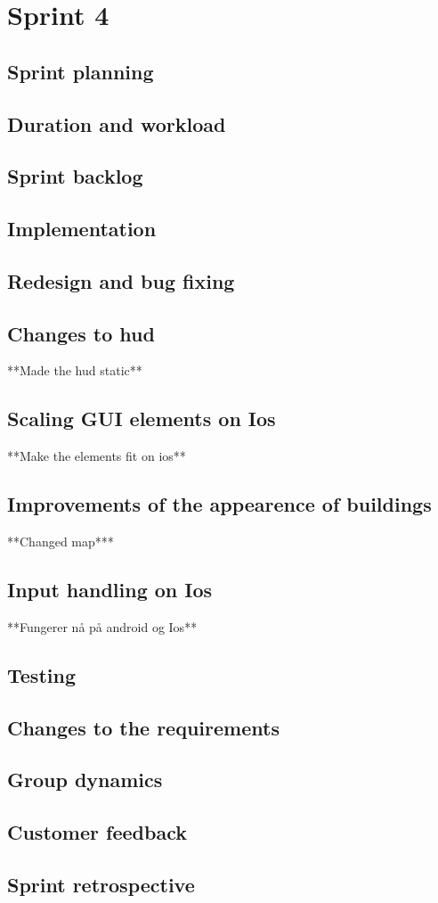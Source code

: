\section{Sprint 4}

\subsection{Sprint planning}

\subsection{Duration and workload}

\subsection{Sprint backlog}

\subsection{Implementation}

\subsection{Redesign and bug fixing}
	
	\subsection*{Changes to hud}
		**Made the hud static**
	\subsection*{Scaling GUI elements on Ios}
		**Make the elements fit on ios**
	\subsection{Improvements of the appearence of buildings}
		**Changed map***
	\subsection{Input handling on Ios}
		**Fungerer nå på android og Ios**

\subsection{Testing}

\subsection{Changes to the requirements}

\subsection{Group dynamics}

\subsection{Customer feedback}

\subsection{Sprint retrospective}

